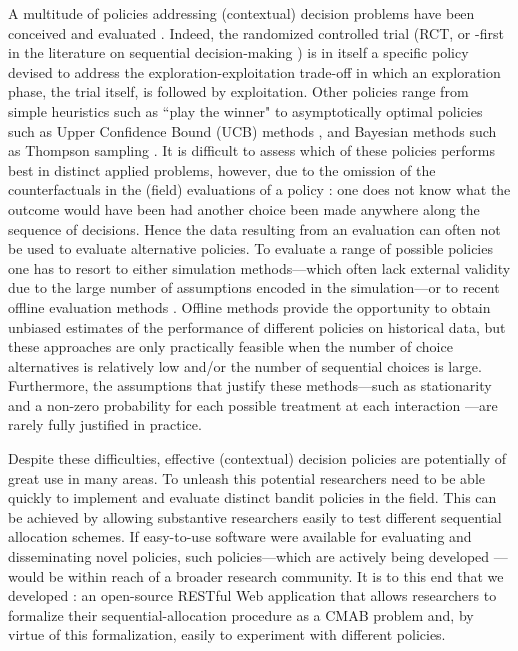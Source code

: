 \documentclass[nojss]{jss}
\begin{document}
A multitude of policies addressing (contextual) decision problems have been conceived and evaluated \citep[see,  e.g.,][]{berry1985bandit, Chapelle2011, Dudik2011a}. Indeed, the randomized controlled trial (RCT, or -first in the literature on sequential decision-making \citep{Chapelle2011}) is in itself a specific policy devised to address the exploration-exploitation trade-off in which an exploration phase, the trial itself, is followed by exploitation. Other policies range from simple heuristics such as ``play the winner"  \citep{Lachin1988,  Villar2015} to asymptotically optimal policies such as Upper Confidence Bound (UCB) methods \citep{Auer2010, Garivier2011, Audibert2009}, and Bayesian methods such as Thompson sampling \citep{thompson1933likelihood, Chapelle2011, Agrawal2011}. It is difficult to assess which of these policies performs best in distinct applied problems, however, due to the omission of the counterfactuals in the (field) evaluations of a policy \citep{Li2010a}: one does not know what the outcome would have been had another choice been made anywhere along the sequence of decisions. Hence the data resulting from an evaluation can often not be used to evaluate alternative policies. To evaluate a range of possible policies one has to resort to either simulation methods---which often lack external validity due to the large number of assumptions encoded in the simulation---or to recent offline evaluation methods \citep{Li2010a, agarwal2016making}. Offline methods provide the opportunity to obtain unbiased estimates of the performance of different policies on historical data, but these approaches are only practically feasible when the number of choice alternatives is relatively low and/or the number of sequential choices is large. Furthermore, the assumptions that justify these methods---such as stationarity and a non-zero probability for each possible treatment at each interaction \citep{Li2010a}---are rarely fully justified in practice.

Despite these difficulties, effective (contextual) decision policies are potentially of great use in many areas. To unleash this potential researchers need to be able quickly to implement and evaluate distinct bandit policies in the field. This can be achieved by allowing substantive researchers easily to test different sequential allocation schemes. If easy-to-use software were available for evaluating and disseminating novel policies, such policies---which are actively being developed \citep[e.g.,][]{Kaptein, Osband2015, bastani2015online}---would be within reach of a broader research community. It is to this end that we developed : an open-source RESTful Web application that allows researchers to formalize their sequential-allocation procedure as a CMAB problem and, by virtue of this formalization, easily to experiment with different policies.  
\end{document}

